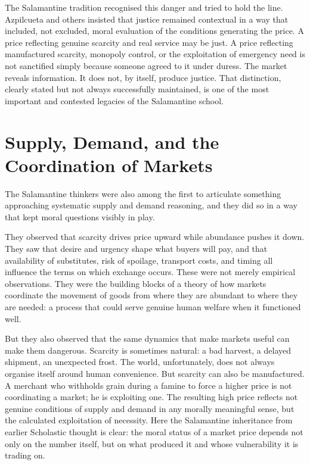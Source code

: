 \documentclass[11pt,a4paper,oneside]{book}
\begin{document}
The Salamantine tradition recognised this danger and tried to hold the line. Azpilcueta and others insisted that justice remained contextual in a way that included, not excluded, moral evaluation of the conditions generating the price. A price reflecting genuine scarcity and real service may be just. A price reflecting manufactured scarcity, monopoly control, or the exploitation of emergency need is not sanctified simply because someone agreed to it under duress. The market reveals information. It does not, by itself, produce justice. That distinction, clearly stated but not always successfully maintained, is one of the most important and contested legacies of the Salamantine school.

\section*{Supply, Demand, and the Coordination of Markets}

The Salamantine thinkers were also among the first to articulate something approaching systematic supply and demand reasoning, and they did so in a way that kept moral questions visibly in play.

They observed that scarcity drives price upward while abundance pushes it down. They saw that desire and urgency shape what buyers will pay, and that availability of substitutes, risk of spoilage, transport costs, and timing all influence the terms on which exchange occurs. These were not merely empirical observations. They were the building blocks of a theory of how markets coordinate the movement of goods from where they are abundant to where they are needed: a process that could serve genuine human welfare when it functioned well.

But they also observed that the same dynamics that make markets useful can make them dangerous. Scarcity is sometimes natural: a bad harvest, a delayed shipment, an unexpected frost. The world, unfortunately, does not always organise itself around human convenience. But scarcity can also be manufactured. A merchant who withholds grain during a famine to force a higher price is not coordinating a market; he is exploiting one. The resulting high price reflects not genuine conditions of supply and demand in any morally meaningful sense, but the calculated exploitation of necessity. Here the Salamantine inheritance from earlier Scholastic thought is clear: the moral status of a market price depends not only on the number itself, but on what produced it and whose vulnerability it is trading on.
\end{document}
